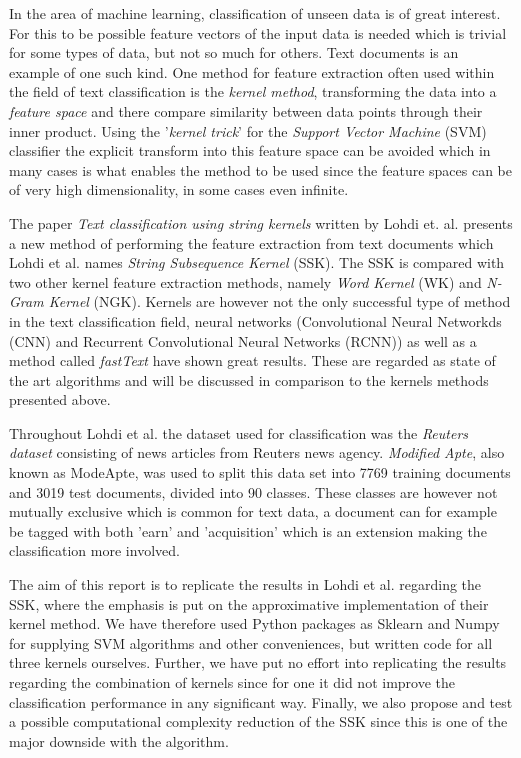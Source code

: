 
In the area of machine learning, classification of unseen data is of great interest. For this to be possible feature vectors of the input data is needed which is trivial for some types of data, but not so much for others. Text documents is an example of one such kind. One method for feature extraction often used within the field of text classification is the \textit{kernel method}, transforming the data into a \textit{feature space} and there compare similarity between data points through their inner product. Using the '\textit{kernel trick}' for the \textit{Support Vector Machine} (SVM) classifier the explicit transform into this feature space can be avoided which in many cases is what enables the method to be used since the feature spaces can be of very high dimensionality, in some cases even infinite. 

The paper \textit{Text classification using string kernels} written by Lohdi et. al. presents a new method of performing the feature extraction from text documents which Lohdi et al. names \textit{String Subsequence Kernel} (SSK). The SSK is compared with two other kernel feature extraction methods, namely \textit{Word Kernel} (WK) and \textit{N-Gram Kernel} (NGK). Kernels are however not the only successful type of method in the text classification field, neural networks (Convolutional Neural Networkds (CNN) and Recurrent Convolutional Neural Networks (RCNN)) as well as a method called \textit{fastText} have shown great results. These are regarded as state of the art algorithms and will be discussed in comparison to the kernels methods presented above. 

Throughout Lohdi et al. the dataset used for classification was the \textit{Reuters dataset} consisting of news articles from Reuters news agency. \textit{Modified Apte}, also known as ModeApte, was used to split this data set into 7769 training documents and 3019 test documents, divided into 90 classes. These classes are however not mutually exclusive which is common for text data, a document can for example be tagged with both 'earn' and 'acquisition' which is an extension making the classification more involved.

The aim of this report is to replicate the results in Lohdi et al. regarding the SSK, where the emphasis is put on the approximative implementation of their kernel method. We have therefore used Python packages as Sklearn and Numpy for supplying SVM algorithms and other conveniences, but written code for all three kernels ourselves. Further, we have put no effort into replicating the results regarding the combination of kernels since for one it did not improve the classification performance in any significant way. Finally, we also propose and test a possible computational complexity reduction of the SSK since this is one of the major downside with the algorithm.

